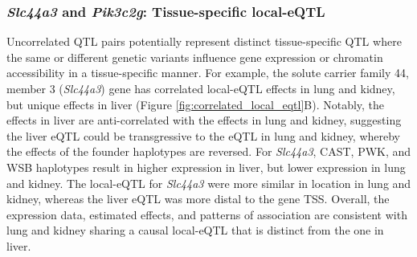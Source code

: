 \documentclass[9pt,twocolumn,twoside]{gsajnl}
\begin{document}
\subsubsection{\textit{Slc44a3} and \textit{Pik3c2g}: Tissue-specific local-eQTL}
Uncorrelated QTL pairs potentially represent distinct tissue-specific QTL where the same or different genetic variants influence gene expression or chromatin accessibility in a tissue-specific manner. For example, the solute carrier family 44, member 3 (\textit{Slc44a3}) gene has correlated local-eQTL effects in lung and kidney, but unique effects in liver (Figure \ref{fig:correlated_local_eqtl}B). Notably, the effects in liver are anti-correlated with the effects in lung and kidney, suggesting the liver eQTL could be transgressive \citep{Rieseberg1999} to the eQTL in lung and kidney, whereby the effects of the founder haplotypes are reversed. For \textit{Slc44a3}, CAST, PWK, and WSB haplotypes result in higher expression in liver, but lower expression in lung and kidney. 
The local-eQTL for \textit{Slc44a3} were more similar in location in lung and kidney, whereas the liver eQTL was more distal to the gene TSS. Overall, the expression data, estimated effects, and patterns of association are consistent with lung and kidney sharing a causal local-eQTL that is distinct from the one in liver. 
\end{document}
